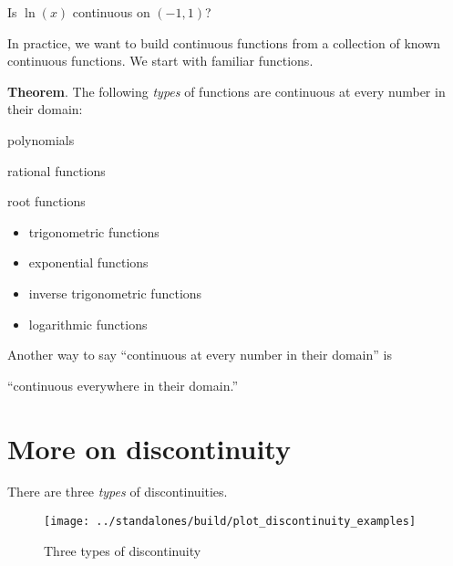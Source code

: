 \documentclass[../main.tex]{subfiles}
\begin{document}
\begin{example}
  Is \(\ln(x)\) continuous on \((-1,1)\)?
\end{example}
\clearpage

In practice, we want to build continuous functions from a collection of known continuous functions. We start with familiar functions.
\begin{mdframed}[style=withref]
  \textbf{Theorem}. The following \emph{types} of functions are continuous at every number in their domain:
  \begin{center}
  \begin{itemize*}
    \item polynomials \phantom{------}
    \item rational functions \phantom{------}
    \item root functions
  \end{itemize*}
  \end{center}

  \begin{minipage}{.45\textwidth}
  \begin{itemize}
    \item trigonometric functions
    \item exponential functions
  \end{itemize}
  \end{minipage}
  \begin{minipage}{.45\textwidth}
  \begin{itemize}
    \item inverse trigonometric functions
    \item logarithmic functions
  \end{itemize}
  \end{minipage}

\end{mdframed}

Another way to say ``continuous at every number in their domain'' is 
\begin{center}
  ``continuous {everywhere} in their domain.''
\end{center}

\section{More on discontinuity}

There are three \emph{types} of discontinuities.

\begin{figure}[h]  %
\centering
\texttt{[image: ../standalones/build/plot\_discontinuity\_examples]}
\caption{Three types of discontinuity}
\label{fig:discontinuities}
\end{figure}
\clearpage
\end{document}
